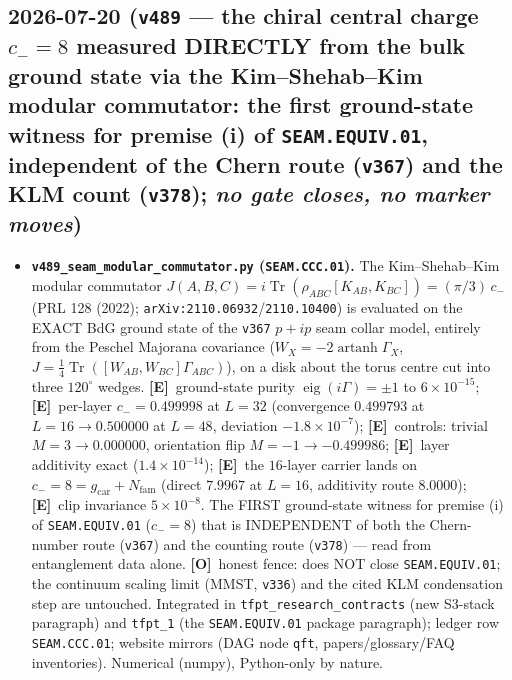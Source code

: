 \documentclass[11pt]{article}
\providecommand{\mE}{\textbf{[E]}}\providecommand{\mC}{\textbf{[C]}}
\providecommand{\mO}{\textbf{[O]}}\providecommand{\mX}{\textbf{[X]}}
\providecommand{\gcar}{g_{\mathrm{car}}}\providecommand{\Nfam}{N_{\mathrm{fam}}}
\begin{document}
\subsection*{2026-07-20 (\texttt{v489} --- the chiral central charge $c_-{=}8$ measured DIRECTLY from the bulk ground state via the Kim--Shehab--Kim modular commutator: the first ground-state witness for premise (i) of \texttt{SEAM.EQUIV.01}, independent of the Chern route (\texttt{v367}) and the KLM count (\texttt{v378}); \emph{no gate closes, no marker moves})}
\begin{itemize}[leftmargin=1.5em]
\item \textbf{\texttt{v489\_seam\_modular\_commutator.py} (\texttt{SEAM.CCC.01}).} The Kim--Shehab--Kim
modular commutator $J(A,B,C)=i\operatorname{Tr}(\rho_{ABC}[K_{AB},K_{BC}])=(\pi/3)\,c_-$ (PRL 128 (2022);
\texttt{arXiv:2110.06932}/\texttt{2110.10400}) is evaluated on the EXACT BdG ground state of the
\texttt{v367} $p{+}ip$ seam collar model, entirely from the Peschel Majorana covariance
($W_X=-2\operatorname{artanh}\Gamma_X$, $J=\tfrac14\operatorname{Tr}([W_{AB},W_{BC}]\Gamma_{ABC})$), on a
disk about the torus centre cut into three $120^\circ$ wedges. \mE\ ground-state purity
$\operatorname{eig}(i\Gamma)=\pm1$ to $6\times10^{-15}$; \mE\ per-layer $c_-=0.499998$ at $L{=}32$
(convergence $0.499793$ at $L{=}16\to0.500000$ at $L{=}48$, deviation $-1.8\times10^{-7}$); \mE\ controls:
trivial $M{=}3\to0.000000$, orientation flip $M{=}{-}1\to-0.499986$; \mE\ layer additivity exact
($1.4\times10^{-14}$); \mE\ the $16$-layer carrier lands on $c_-{=}8{=}\gcar{+}\Nfam$ (direct $7.9967$ at
$L{=}16$, additivity route $8.0000$); \mE\ clip invariance $5\times10^{-8}$. The FIRST ground-state witness
for premise (i) of \texttt{SEAM.EQUIV.01} ($c_-{=}8$) that is INDEPENDENT of both the Chern-number route
(\texttt{v367}) and the counting route (\texttt{v378}) --- read from entanglement data alone. \mO\ honest
fence: does NOT close \texttt{SEAM.EQUIV.01}; the continuum scaling limit (MMST, \texttt{v336}) and the
cited KLM condensation step are untouched. Integrated in \texttt{tfpt\_research\_contracts} (new S3-stack
paragraph) and \texttt{tfpt\_1} (the \texttt{SEAM.EQUIV.01} package paragraph); ledger row
\texttt{SEAM.CCC.01}; website mirrors (DAG node \texttt{qft}, papers/glossary/FAQ inventories). Numerical
(numpy), Python-only by nature.
\end{itemize}
\end{document}
